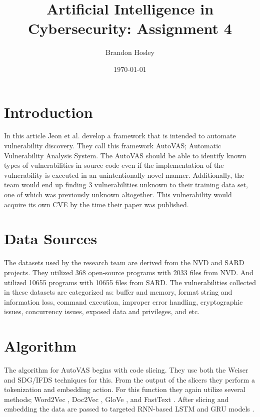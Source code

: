 \documentclass[]{article}
\title{Artificial Intelligence in Cybersecurity: Assignment 4}
\author{Brandon Hosley}
\date{\today}
\begin{document}
	\maketitle
	
\section{Introduction}

In this article \cite{Jeon2021} Jeon et al. develop a framework that is intended to automate vulnerability discovery.
They call this framework AutoVAS; Automatic Vulnerability Analysis System.
The AutoVAS should be able to identify known types of vulnerabilities in source code even if the implementation of the vulnerability is executed in an unintentionally novel manner.
Additionally, the team would end up finding 3 vulnerabilities unknown to their training data set,
one of which was previously unknown altogether.
This vulnerability would acquire its own CVE by the time their paper was published.

\section{Data Sources}

The datasets used by the research team are derived from the NVD and SARD projects.
They utilized 368 open-source programs with 2033 files from NVD.
And utilized 10655 programs with 10655 files from SARD.
The vulnerabilities collected in these datasets are categorized as:
buffer and memory,
format string and information loss,
command execution,
improper error handling,
cryptographic issues,
concurrency issues,
exposed data and privileges,
and etc.

\section{Algorithm}

The algorithm for AutoVAS begins with code slicing.
They use both the Weiser \cite{Weiser1984} and SDG/IFDS \cite{Naeem2010} techniques for this.
From the output of the slicers they perform a tokenization and embedding action.
For this function they again utilize several methods;
Word2Vec \cite{Mikolov2013},
Doc2Vec \cite{Le2014},
GloVe \cite{Pennington2014},
and FastText \cite{Mikolov2017}.
After slicing and embedding the data are passed to targeted RNN-based LSTM and GRU models \cite{Su2017}.
\end{document}

